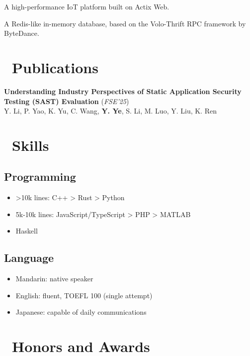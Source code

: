\documentclass{resume}
\begin{document}
A high-performance IoT platform built on Actix Web.

A Redis-like in-memory database, based on the Volo-Thrift RPC framework by ByteDance.

\section{\faBookmarkO\ Publications}

\textbf{Understanding Industry Perspectives of Static Application Security Testing (SAST) Evaluation} (\textit{FSE'25})\\
Y. Li, P. Yao, K. Yu, C. Wang, \textbf{Y. Ye}, S. Li, M. Luo, Y. Liu, K. Ren \\

\section{\faCogs\ Skills}
\subsection{\textbf{Programming}}
\begin{itemize}[itemsep=0.5ex]
  \item >10k lines: C++ > Rust > Python
  \item 5k-10k lines: JavaScript/TypeScript > PHP > MATLAB
  \item <5k lines: Java > Haskell
\end{itemize}
\subsection{\textbf{Language}}
\begin{itemize}[itemsep=0.5ex]
  \item Mandarin: native speaker
  \item English: fluent, TOEFL 100 (single attempt)
  \item Japanese: capable of daily communications
\end{itemize}

\section{\faHeartO\ Honors and Awards}
\end{document}

